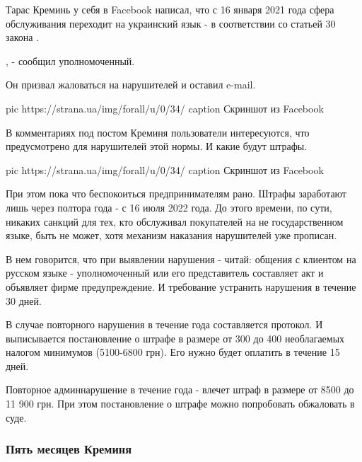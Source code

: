 Тарас Креминь у себя в Facebook написал, что с 16 января 2021 года сфера
обслуживания переходит на украинский язык - в соответствии со статьей 30 закона
. 

, - сообщил уполномоченный. 

Он призвал жаловаться на нарушителей и оставил e-mail.

\ifcmt
pic https://strana.ua/img/forall/u/0/34/%
caption Скриншот из Facebook
\fi

В комментариях под постом Креминя пользователи интересуются, что предусмотрено
для нарушителей этой нормы. И какие будут штрафы. 

\ifcmt
pic https://strana.ua/img/forall/u/0/34/%
caption Скриншот из Facebook
\fi

При этом пока что беспокоиться предпринимателям рано. Штрафы заработают лишь
через полтора года - с 16 июля 2022 года. До этого времени, по сути, никаких
санкций для тех, кто обслуживал покупателей на не государственном языке, быть
не может, хотя механизм наказания нарушителей уже прописан. 

В нем говорится, что при выявлении нарушения - читай: общения с клиентом на
русском языке - уполномоченный или его представитель составляет акт и объявляет
фирме предупреждение. И требование устранить нарушения в течение 30 дней. 

В случае повторного нарушения в течение года составляется протокол. И
выписывается постановление о штрафе в размере от 300 до 400 необлагаемых
налогом минимумов (5100-6800 грн). Его нужно будет оплатить в течение 15 дней.

Повторное админнарушение в течение года - влечет штраф в размере от 8500 до 11
900 грн. При этом постановление о штрафе можно попробовать обжаловать в суде. 

\subsubsection{Пять месяцев Креминя}

